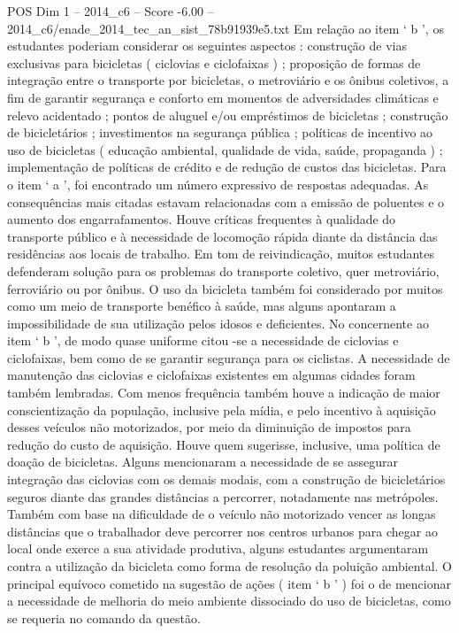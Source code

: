 \begin{textsample}{POS Dim 1 – 2014\_c6 – Score -6.00 – 2014\_c6/enade\_2014\_tec\_an\_sist\_78b91939e5.txt}
Em relação ao item ‘ b ’, os estudantes poderiam considerar os seguintes aspectos : construção de vias exclusivas para bicicletas ( ciclovias e ciclofaixas ) ; proposição de formas de integração entre o transporte por bicicletas, o metroviário e os ônibus coletivos, a fim de garantir segurança e conforto em momentos de adversidades climáticas e relevo acidentado ; pontos de aluguel e/ou empréstimos de bicicletas ; construção de bicicletários ; investimentos na segurança pública ; políticas de incentivo ao uso de bicicletas ( educação ambiental, qualidade de vida, saúde, propaganda ) ; implementação de políticas de crédito e de redução de custos das bicicletas.
Para o item ‘ a ’, foi encontrado um número expressivo de respostas adequadas.
As consequências mais citadas estavam relacionadas com a emissão de poluentes e o aumento dos engarrafamentos.
Houve críticas frequentes à qualidade do transporte público e à necessidade de locomoção rápida diante da distância das residências aos locais de trabalho.
Em tom de reivindicação, muitos estudantes defenderam solução para os problemas do transporte coletivo, quer metroviário, ferroviário ou por ônibus.
O uso da bicicleta também foi considerado por muitos como um meio de transporte benéfico à saúde, mas alguns apontaram a impossibilidade de sua utilização pelos idosos e deficientes.
No concernente ao item ‘ b ’, de modo quase uniforme citou -se a necessidade de ciclovias e ciclofaixas, bem como de se garantir segurança para os ciclistas.
A necessidade de manutenção das ciclovias e ciclofaixas existentes em algumas cidades foram também lembradas.
Com menos frequência também houve a indicação de maior conscientização da população, inclusive pela mídia, e pelo incentivo à aquisição desses veículos não motorizados, por meio da diminuição de impostos para redução do custo de aquisição.
Houve quem sugerisse, inclusive, uma política de doação de bicicletas.
Alguns mencionaram a necessidade de se assegurar integração das ciclovias com os demais modais, com a construção de bicicletários seguros diante das grandes distâncias a percorrer, notadamente nas metrópoles.
Também com base na dificuldade de o veículo não motorizado vencer as longas distâncias que o trabalhador deve percorrer nos centros urbanos para chegar ao local onde exerce a sua atividade produtiva, alguns estudantes argumentaram contra a utilização da bicicleta como forma de resolução da poluição ambiental.
O principal equívoco cometido na sugestão de ações ( item ‘ b ’ ) foi o de mencionar a necessidade de melhoria do meio ambiente dissociado do uso de bicicletas, como se requeria no comando da questão.

\end{textsample}
